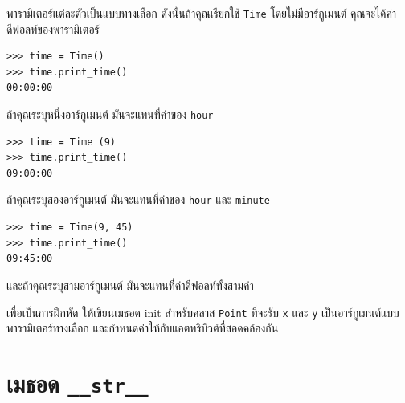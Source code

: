 
พารามิเตอร์แต่ละตัวเป็นแบบทางเลือก ดังนั้นถ้าคุณเรียกใช้ {\tt Time} โดยไม่มีอาร์กูเมนต์ คุณจะได้ค่าดีฟอลท์ของพารามิเตอร์

\begin{verbatim}
>>> time = Time()
>>> time.print_time()
00:00:00
\end{verbatim}
%

ถ้าคุณระบุหนึ่งอาร์กูเมนต์ มันจะแทนที่ค่าของ {\tt hour}

\begin{verbatim}
>>> time = Time (9)
>>> time.print_time()
09:00:00
\end{verbatim}
%

ถ้าคุณระบุสองอาร์กูเมนต์ มันจะแทนที่ค่าของ {\tt hour} และ {\tt minute}

\begin{verbatim}
>>> time = Time(9, 45)
>>> time.print_time()
09:45:00
\end{verbatim}
%

และถ้าคุณระบุสามอาร์กูเมนต์ มันจะแทนที่ค่าดีฟอลท์ทั้งสามค่า


เพื่อเป็นการฝึกหัด ให้เขียนเมธอด init สำหรับคลาส {\tt Point} ที่จะรับ {\tt x} และ {\tt y} เป็นอาร์กูเมนต์แบบพารามิเตอร์ทางเลือก และกำหนดค่าให้กับแอตทริบิวต์ที่สอดคล้องกัน


\section{เมธอด \texttt{\_\_str\_\_} } %


